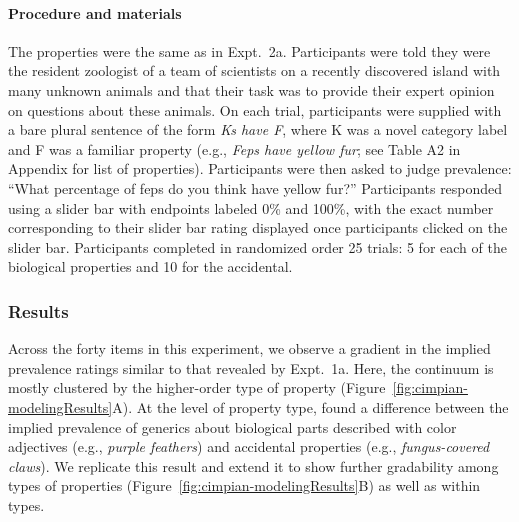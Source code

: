 \documentclass[floatsintext,doc]{apa6}
\let\oldparagraph\paragraph
\renewcommand{\paragraph}[1]{\oldparagraph{#1}\mbox{}}
\newcommand{\ndg}[1]{{\textcolor{Green}{[ndg: #1]}}}
\begin{document}
\paragraph{Procedure and materials}
The properties were the same as in Expt.~2a.
Participants were told they were the resident zoologist of a team of scientists on a recently discovered island with many unknown animals and that their task was to provide their expert opinion on questions about these animals.
On each trial, participants were supplied with a bare plural sentence of the form \emph{Ks have F}, where K was a novel category label and F was a familiar property (e.g., \emph{Feps have yellow fur}; see Table A2 in Appendix for list of properties).
Participants were then asked to judge prevalence: \enquote{What percentage of feps do you think have yellow fur?}
Participants responded using a slider bar with endpoints labeled 0\% and 100\%, with the exact number corresponding to their slider bar rating displayed once participants clicked on the slider bar.
Participants completed in randomized order 25 trials: 5 for each of the biological properties and 10 for the accidental.

\hypertarget{results-and-discussion}{%
\subsubsection{Results}\label{results-and-discussion}}

Across the forty items in this experiment, we observe a gradient in the implied prevalence ratings similar to that revealed by Expt.~1a. Here, the continuum is mostly clustered by the higher-order type of property (Figure~\ref{fig:cimpian-modelingResults}A).
At the level of property type,  found a difference between the implied prevalence of generics about biological parts described with color adjectives (e.g., \emph{purple feathers}) and accidental properties (e.g., \emph{fungus-covered claws}).
We replicate this result and extend it to show further gradability among types of properties (Figure~\ref{fig:cimpian-modelingResults}B) as well as within types.
\end{document}
